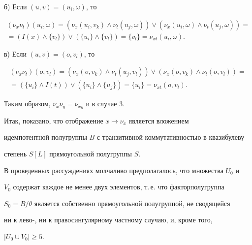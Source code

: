 \begin{pf}
б) Если $(u,v)=(u_i,\omega)$, то


\begin{multline*}


(\nu_x\nu_t)(u_i,\omega)=(\nu_x(u_i,v_k)\wedge\nu_t(u_j,\omega))


\vee(\nu_x(u_i,\omega)\wedge\nu_t(u_j,\omega))= \\


=(I(x)\wedge\{v_l\})\vee(\{u_i\}\wedge\{v_l\})=\{v_l\}


=\nu_{xt}(u_i,\omega).


\end{multline*}





в) Если $(u,v)=(o,v_l)$, то


\begin{multline*}


(\nu_x\nu_t)(o,v_l)=(\nu_x(o,v_k)\wedge\nu_t(u_j,v_l))


\vee(\nu_x(o,v_k)\wedge\nu_t(o,v_l))= \\


=(\{u_i\}\wedge


I(t))\vee(\{u_i\}\wedge\{u_j\})=\{u_i\}=\nu_{xt}(o,v_l).


\end{multline*}





Таким образом, $\nu_x\nu_y=\nu_{xy}$ и в случае 3.





Итак, показано, что отображение $x\mapsto \nu_x$ является вложением


идемпотентной полугруппы $B$ с транзитивной коммутативностью в квазибулеву


степень $S[L]$ прямоугольной полугруппы $S$.





В проведенных рассуждениях молчаливо предполагалось, что множества $U_0$ и


$V_0$ содержат каждое не менее двух элементов, т.\,е. что факторполугруппа


$S_0=B/\theta$ является собственно прямоугольной полугруппой, не сводящейся


ни к лево-, ни к правосингулярному частному случаю, и, кроме того,


$|U_0\cup V_0|\geqslant 5$.






\end{pf}
